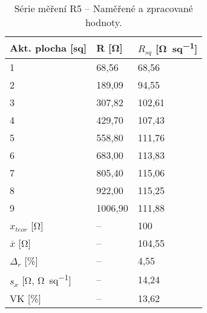 \begin{table}[h!]
    \caption{Série měření R5 -- Naměřené a zpracované hodnoty.}
    \centering
    \def\arraystretch{1.4}
    \begin{tabular}{l|l|l}
        Akt. plocha [sq]                              & R [\unit{\ohm}]    & \(R_{sq}\) [\unit{\ohm\per sq}]  \\ \hline\hline
        1                                             & 68,56   & 68,56 \\ \hline
        2                                             & 189,09  & 94,55 \\ \hline
        3                                             & 307,82  & 102,61 \\ \hline
        4                                             & 429,70  & 107,43 \\ \hline
        5                                             & 558,80  & 111,76 \\ \hline
        6                                             & 683,00  & 113,83 \\ \hline
        7                                             & 805,40  & 115,06 \\ \hline
        8                                             & 922,00  & 115,25 \\ \hline
        9                                             & 1006,90 & 111,88 \\ \hline\hline
        \(x_{teor} \) [\unit{\ohm}]                   & --      & 100    \\ \hline
        \(\overline{x} \) [\unit{\ohm}]               & --      & 104,55 \\ \hline
        \(\Delta_{r} \) [\unit{\percent}]             & --      & 4,55\\ \hline\hline
        \(s_{x} \) [\unit{\ohm}, \unit{\ohm\per sq}]  & --      & 14,24   \\ \hline
        VK [\unit{\percent}]                          & --      & 13,62 \\ 
    \end{tabular}
    \label{tab:r5_hodnoty}
\end{table}


